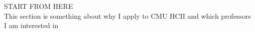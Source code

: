 \noindent
{\Huge START FROM HERE}\\
This section is something about why I apply to CMU HCII 
and which professors I am interested in\\
